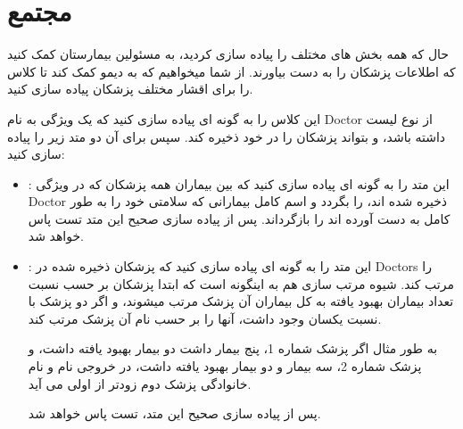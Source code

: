     \section{مجتمع}
        حال که همه بخش های مختلف را پیاده سازی کردید، به مسئولین بیمارستان کمک کنید که اطلاعات پزشکان را به دست بیاورند.
        از شما میخواهیم که به دیمو کمک کند تا کلاس 
        را برای اقشار مختلف پزشکان پیاده سازی کنید.
        
        این کلاس
        را به گونه ای پیاده سازی کنید که یک ویژگی به نام 
        Doctor
        از نوع لیست داشته باشد، و بتواند پزشکان را در خود ذخیره کند.
        سپس برای آن دو متد زیر را پیاده سازی کنید:
        \\
        \begin{itemize}
        \item 
            \grayBox{\textcolor{orange}{ListOfRecoveredPatients}}
            :
            این متد را به گونه ای پیاده سازی کنید که بین
            بیماران همه پزشکان که در ویژگی Doctor 
            ذخیره شده اند، را بگردد و اسم کامل
             بیمارانی که سلامتی خود را به طور کامل به دست آورده اند را بازگرداند.
            پس از پیاده سازی صحیح این متد تست
            \grayBox{\textcolor{dkgreen}{ListOfRecoveredPatientsTests}}
            پاس خواهد شد.

        \item
            \grayBox{\textcolor{orange}{SortDoctors}}
            :
            این متد را به گونه ای پیاده سازی کنید که پزشکان ذخیره شده در Doctors را مرتب کند.
            شیوه مرتب سازی هم به اینگونه است که ابتدا پزشکان بر حسب نسبت تعداد بیماران بهبود یافته به کل بیماران آن پزشک مرتب میشوند، و اگر دو پزشک با نسبت یکسان وجود داشت، آنها را بر حسب نام آن پزشک مرتب کند.        
            
            به طور مثال اگر پزشک شماره 1، پنج بیمار داشت دو بیمار بهبود یافته داشت، و پزشک شماره 2، سه بیمار و دو بیمار بهبود یافته داشت،
            در خروجی نام و نام خانوادگی پزشک دوم زودتر از اولی می آید.
            
            پس از پیاده سازی صحیح این متد، تست
            \grayBox{\textcolor{dkgreen}{SortingDoctorsTests}}
            پاس خواهد شد.
            
        
        \end{itemize}
    \\
    \\
    \\
    \\
    